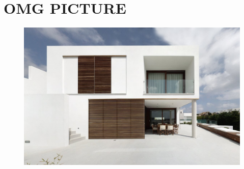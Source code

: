 \clearpage

\section{OMG PICTURE}

\begin{figure}[H]
	\centering
	\includegraphics[width=.7\textwidth]{gfx/modern-minimalist-square-house-menorca-sun-shades-for-the-windows-ideas.jpg}
\end{figure}

